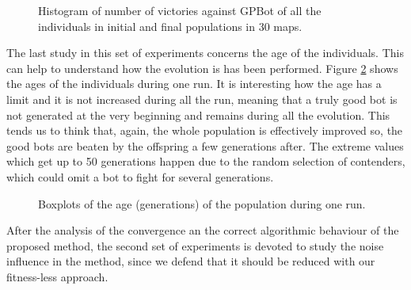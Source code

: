 \documentclass[conference]{IEEEtran}
\begin{document}
\begin{figure}[htb]
\tiny
\begin{center}
\end{center}
\caption{Histogram of number of victories against GPBot of all the individuals in initial and final populations in 30 maps.}
\label{figura:Victories_VS_GPBot_AllMaps}
\end{figure}

The last study in this set of experiments concerns the age of the individuals. This can help to understand how the evolution is has been performed. Figure \ref{figura:age} shows the ages of the individuals during one run. It is interesting how the age has a limit and it is not increased during all the run, meaning that a truly good bot is not generated at the very beginning and remains  during all the evolution. This tends us to think that, again, the whole population is effectively improved so, the good bots are beaten by the offspring a few generations after. The extreme values which get up to 50 generations happen due to the random selection of contenders, which could omit a bot to fight for several generations.

\begin{figure}[htb]
\tiny
\begin{center}
\end{center}
\caption{Boxplots of the age (generations) of the population during one run.}

\label{figura:age}
\end{figure}



After the analysis of the convergence an the correct algorithmic behaviour of the proposed method, the second set of experiments is devoted to study the noise influence in the method, since we defend that it should be reduced with our fitness-less approach.

\end{document}
